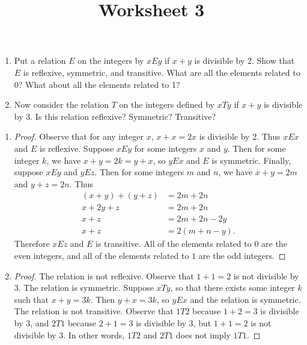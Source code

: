 \documentclass{article}
\title{Worksheet 3}
\begin{document}
  \maketitle
  \newpage
  \begin{problem}{1}
    \begin{enumerate}[label=(\alph*)]
      \item Put a relation $E$ on the integers by $xEy$ if $x+y$ is divisible by 2. Show that $E$ is reflexive, symmetric, and transitive. What are all the elements related to 0? What about all the elements related to 1?
      \item Now consider the relation $T$ on the integers defined by $xTy$ if $x + y$ is divisible by 3. Is this relation reflexive? Symmetric? Transitive?
    \end{enumerate}
  \end{problem}
  \begin{enumerate}[label=(\alph*)]
    \item
    \begin{proof}
      Observe that for any integer $x$, $x + x = 2x$ is divisible by 2. Thus $xEx$ and $E$ is reflexive. Suppose $xEy$ for some integers $x$ and $y$. Then for some integer $k$, we have $x+y = 2k = y+x$, so $yEx$ and $E$ is symmetric. Finally, suppose $xEy$ and $yEz$. Then for some integers $m$ and $n$, we have $x + y = 2m$ and $y + z = 2n$. Thus
      \begin{align*}
        (x+y) + (y+z) &= 2m + 2n \\
        x + 2y + z &= 2m + 2n \\
        x + z &= 2m + 2n - 2y \\
        x + z &= 2(m + n - y).
      \end{align*}
      Therefore $xEz$ and $E$ is transitive. All of the elements related to $0$ are the even integers, and all of the elements related to $1$ are the odd integers.
    \end{proof}
    \item
    \begin{proof}
      The relation is not reflexive. Observe that $1 + 1 = 2$ is not divisible by $3$. The relation is symmetric. Suppose $xTy$, so that there exists some integer $k$ such that $x + y = 3k$. Then $y + x = 3k$, so $yEx$ and the relation is symmetric. The relation is not transitive. Observe that $1T2$ because $1 + 2 = 3$ is divisible by $3$, and $2T1$ because $2 + 1 = 3$ is divisible by $3$, but $1 + 1 = 2$ is not divisible by $3$. In other words, $1T2$ and $2T1$ does not imply $1T1$.
    \end{proof}
  \end{enumerate}
\end{document}

